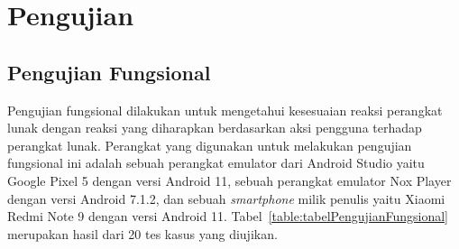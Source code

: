 \section{Pengujian}
\label{sec:pengujian}

\subsection{Pengujian Fungsional}
\label{subsec:pengujianFungsional}

Pengujian fungsional dilakukan untuk mengetahui kesesuaian reaksi perangkat lunak dengan reaksi yang diharapkan berdasarkan aksi pengguna terhadap perangkat lunak. Perangkat yang digunakan untuk melakukan pengujian fungsional ini adalah sebuah perangkat emulator dari Android Studio yaitu Google Pixel 5 dengan versi Android 11, sebuah perangkat emulator Nox Player dengan versi Android 7.1.2, dan sebuah \textit{smartphone} milik penulis yaitu Xiaomi Redmi Note 9 dengan versi Android 11. Tabel~\ref{table:tabelPengujianFungsional} merupakan hasil dari 20 tes kasus yang diujikan.

